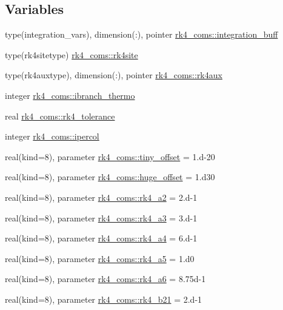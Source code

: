 \subsection*{Variables}
\begin{DoxyCompactItemize}
\item 
type(integration\+\_\+vars), dimension(\+:), pointer \hyperlink{namespacerk4__coms_a3c62cf3b7294822d789a72c33ed42538}{rk4\+\_\+coms\+::integration\+\_\+buff}
\item 
type(rk4sitetype) \hyperlink{namespacerk4__coms_a3b1e8e5ff59d681b92bc9f477f91a111}{rk4\+\_\+coms\+::rk4site}
\item 
type(rk4auxtype), dimension(\+:), pointer \hyperlink{namespacerk4__coms_af06182f853d5a71c46e249e55fe5a678}{rk4\+\_\+coms\+::rk4aux}
\item 
integer \hyperlink{namespacerk4__coms_a33cf51cec0937e19a61030894187ddbc}{rk4\+\_\+coms\+::ibranch\+\_\+thermo}
\item 
real \hyperlink{namespacerk4__coms_ab839ff31cd3abc7dd1fd40e4d3983a31}{rk4\+\_\+coms\+::rk4\+\_\+tolerance}
\item 
integer \hyperlink{namespacerk4__coms_a49c5428026d0aece9bcf4f9a87c7b823}{rk4\+\_\+coms\+::ipercol}
\item 
real(kind=8), parameter \hyperlink{namespacerk4__coms_a3d0ca14edbf0ca895d40d7a9c49e75da}{rk4\+\_\+coms\+::tiny\+\_\+offset} = 1.d-\/20
\item 
real(kind=8), parameter \hyperlink{namespacerk4__coms_a09bb1518d1ed93891ef24fa73feb7cbe}{rk4\+\_\+coms\+::huge\+\_\+offset} = 1.d30
\item 
real(kind=8), parameter \hyperlink{namespacerk4__coms_aaccaa3d4ec955eecd38ce2c8c8813cf9}{rk4\+\_\+coms\+::rk4\+\_\+a2} = 2.d-\/1
\item 
real(kind=8), parameter \hyperlink{namespacerk4__coms_aaa2167ee06ad594c46793e7280b248f7}{rk4\+\_\+coms\+::rk4\+\_\+a3} = 3.d-\/1
\item 
real(kind=8), parameter \hyperlink{namespacerk4__coms_aaa712c298024351472a4f80d5020e7fc}{rk4\+\_\+coms\+::rk4\+\_\+a4} = 6.d-\/1
\item 
real(kind=8), parameter \hyperlink{namespacerk4__coms_ac364eca74fa5b87b0821f6e547e30368}{rk4\+\_\+coms\+::rk4\+\_\+a5} = 1.d0
\item 
real(kind=8), parameter \hyperlink{namespacerk4__coms_a572359022b68f636423b3dde68f9c34a}{rk4\+\_\+coms\+::rk4\+\_\+a6} = 8.\+75d-\/1
\item 
real(kind=8), parameter \hyperlink{namespacerk4__coms_a34abdb75b43eceb865d986e7874e03d7}{rk4\+\_\+coms\+::rk4\+\_\+b21} = 2.d-\/1

\end{DoxyCompactItemize}
